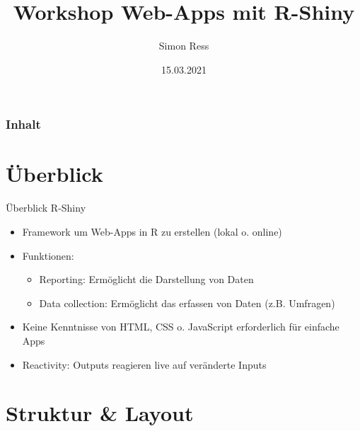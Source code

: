 \documentclass[xcolor=dvipsnames]{beamer}\usepackage[]{graphicx}\usepackage[]{color}
\author{Simon Ress}
\institute{Ruhr-Universität Bochum}
\title{Workshop Web-Apps mit R-Shiny}
\date{15.03.2021}
\begin{document}



  \maketitle

  \begin{frame}
  \frametitle{Inhalt} 
  \tableofcontents
  \end{frame}



\section{Überblick} %

\begin{frame}{Überblick R-Shiny}
  \begin{itemize}
    \item Framework um Web-Apps in R zu erstellen (lokal o. online)
    \item Funktionen:
      \begin{itemize}
        \item Reporting: Ermöglicht die Darstellung von Daten
        \item Data collection: Ermöglicht das erfassen von Daten (z.B. Umfragen)
      \end{itemize}
    \item Keine Kenntnisse von HTML, CSS o. JavaScript erforderlich für einfache Apps
    \item Reactivity: Outputs reagieren live auf veränderte Inputs 
  \end{itemize}
\end{frame}




\section{Struktur \& Layout} %
\end{document}
